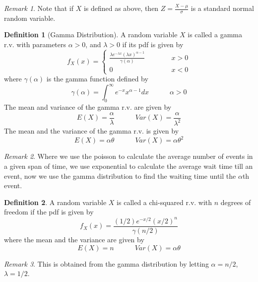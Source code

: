 \documentclass{article}
\theoremstyle{definition}
\newtheorem{definition}{Definition}[section]
\theoremstyle{remark}
\newtheorem{remark}{Remark}[section]
\begin{document}
\begin{remark}
Note that if $X$ is defined as above, then $Z = \frac{X - \mu }{\sigma}$ is a standard 
normal random variable.
\end{remark}






\vspace{.5cm}

\begin{definition}[Gamma Distribution]
A random variable $X$ is called a gamma r.v. with parameters $\alpha >0$, and $\lambda >0$ if its pdf is given by
\[
f_X(x) = \begin{cases}
    \frac{\lambda e^{-\lambda x} (\lambda x)^{\alpha - 1}}{\gamma ( \alpha)} \quad \quad \quad & x > 0 \\
    0  & x < 0
\end{cases}
\]
where $\gamma ( \alpha)$ is the gamma function defined by
\[
\gamma ( \alpha ) = \int_{0}^{\infty} e^{-x} x^{\alpha - 1} dx \quad \quad \quad \alpha > 0
\]
The mean and variance of the gamma r.v. are given by \[
E(X) = \frac{\alpha }{\lambda} \quad \quad \quad Var(X) = \frac{\alpha }{\lambda ^2}
\]
The mean and the variance of the gamma r.v. is given by
\[
E(X) = \alpha \theta \quad \quad \quad Var(X) = \alpha \theta ^2
\]
\end{definition}


\begin{remark}
Where we use the poisson to calculate the average number of events in a given span of time, 
we use exponential to calculate the average wait time till an event, 
now we use the gamma distribution to find the waiting time until the $\alpha$th event.
\end{remark}

\vspace{.5cm}


\begin{definition}
A random variable $X$ is called a chi-squared r.v. with $n$ degrees of freedom if the pdf is given by
\[
f_X (x) = \frac{(1/2)e^{-x/2} (x/2)^{n}}{\gamma (n/2)}
\]
where the mean and the variance are given by \[
E(X) = n \quad \quad \quad Var(X) = \alpha \theta
\]
\end{definition}

\begin{remark}
This is obtained from the gamma distribution by letting $\alpha = n/2$, $\lambda = 1/2$.
\end{remark}





\vspace{.5cm}
\end{document}

